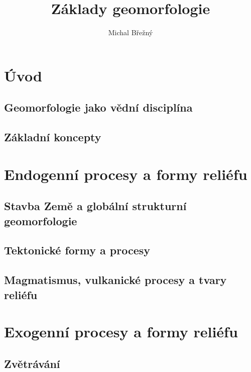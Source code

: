 \documentclass[]{skripta}
\title{Základy geomorfologie}
\author{Michal Břežný}
\begin{document}
		
	\onecolumn
	
	\pagestyle{empty}	
	\clearpage

	\frontmatter

	\pagestyle{fancy}
	 
	
	
	\setcounter{tocdepth}{2}
	\tableofcontents
	
	\mainmatter
	\twocolumn
	\part{Úvod}
	
	\chapter{Geomorfologie jako vědní disciplína}
	
	
	\chapter{Základní koncepty}
	
	\part{Endogenní procesy a formy reliéfu}
	
	\chapter{Stavba Země a globální strukturní geomorfologie}
	
		
	\chapter{Tektonické formy a procesy}
	

	\chapter{Magmatismus, vulkanické procesy a tvary reliéfu}
	

	\part{Exogenní procesy a formy reliéfu}

	\chapter{Zvětrávání}
	
\end{document}
